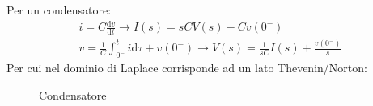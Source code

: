 \documentclass{article}
\newcommand{\df}{\mathrm{d}}
\numberwithin{equation}{subsection}
\begin{document}
Per un condensatore:
\begin{gather*}
    i=\displaystyle C\frac{\df v}{\df t}\to I(s)=sCV(s)-Cv(0^-)\\
    v=\displaystyle\frac{1}{C}\int_{0^-}^ti\df\tau+v(0^-)\to V(s)=\frac{1}{sC}I(s)+\frac{v(0^-)}{s}
\end{gather*}
Per cui nel dominio di Laplace corrisponde ad un lato Thevenin/Norton:
\begin{figure}[ht]%
    \centering
    \qquad
    \qquad
    \caption{Condensatore}
    \label{fig:condensatore-tempo-laplace}
\end{figure}
\end{document}
